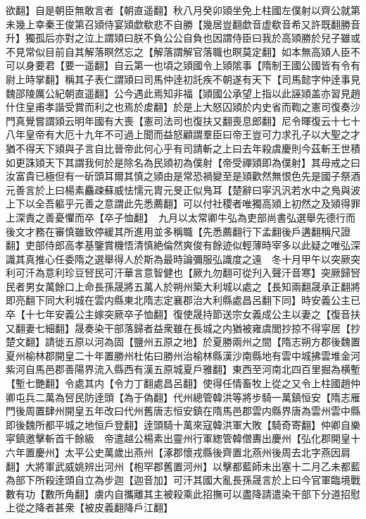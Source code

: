 欲翻】自是朝臣無敢言者【朝直遥翻】秋八月癸卯熲坐免上柱國左僕射以齊公就第未幾上幸秦王俊第召熲侍宴熲歔欷悲不自勝【幾居豈翻歔音虚欷音希又許既翻勝音升】獨孤后亦對之泣上謂熲曰朕不負公公自負也因謂侍臣曰我於高熲勝於兒子雖或不見常似目前自其解落瞑然忘之【解落謂解官落職也瞑莫定翻】如本無高熲人臣不可以身要君【要一遥翻】自云第一也頃之熲國令上熲隂事【隋制王國公國皆有令有尉上時掌翻】稱其子表仁謂熲曰司馬仲逹初託疾不朝遂有天下【司馬懿字仲逹事見魏邵陵厲公紀朝直遥翻】公今遇此焉知非福【熲國公承望上指以此誣熲盖亦習見趙什住皇甫孝諧受賞而利之也焉於䖍翻】於是上大怒囚熲於内史省而鞫之憲司復奏沙門真覺嘗謂熲云明年國有大喪【憲司法司也復扶又翻喪息郎翻】尼令暉復云十七十八年皇帝有大厄十九年不可過上聞而益怒顧謂羣臣曰帝王豈可力求孔子以大聖之才猶不得天下熲與子言自比晉帝此何心乎有司請斬之上曰去年殺虞慶則今茲斬王世積如更誅熲天下其謂我何於是除名為民熲初為僕射【帝受禪熲即為僕射】其母戒之曰汝富貴已極但有一斫頭耳爾其慎之熲由是常恐禍變至是熲歡然無恨色先是國子祭酒元善言於上曰楊素麤疎蘇威怯懦元胄元旻正似鳬耳【楚辭曰寜汎汎若水中之鳬與波上下以全吾軀乎元善之意謂此先悉薦翻】可以付社稷者唯獨高熲上初然之及熲得罪上深責之善憂懼而卒【卒子恤翻】　九月以太常卿牛弘為吏部尚書弘選舉先德行而後文才務在審慎雖致停緩其所進用並多稱職【先悉薦翻行下孟翻後戶遘翻稱尺證翻】吏部侍郎高孝基鑒賞機悟清慎絶倫然爽俊有餘迹似輕薄時宰多以此疑之唯弘深識其真推心任委隋之選舉得人於斯為最時論彌服弘識度之遠　冬十月甲午以突厥突利可汗為意利珍豆唘民可汗華言意智健也【厥九勿翻可從刋入聲汗音寒】突厥歸唘民者男女萬餘口上命長孫晟將五萬人於朔州築大利城以處之【長知兩翻晟承正翻將即亮翻下同大利城在雲内縣東北隋志定襄郡治大利縣處昌呂翻下同】時安義公主已卒【十七年安義公主嫁突厥卒子恤翻】復使晟持節送宗女義成公主以妻之【復音扶又翻妻七細翻】晟奏染干部落歸者益衆雖在長城之内猶被雍虞閭抄掠不得寜居【抄楚文翻】請徙五原以河為固【鹽州五原之地】於夏勝兩州之間【隋志朔方郡後魏置夏州榆林郡開皇二十年置勝州杜佑曰勝州治榆林縣漢沙南縣地有雲中城拂雲堆金河紫河自馬邑郡善陽界流入縣西有漢五原城夏戶雅翻】東西至河南北四百里掘為横塹【塹七艷翻】令處其内【令力丁翻處昌呂翻】使得任情畜牧上從之又令上柱國趙仲卿屯兵二萬為唘民防逹頭【為于偽翻】代州總管韓洪等將步騎一萬鎮恒安【隋志雁門後周置肆州開皇五年改曰代州舊唐志恒安鎮在隋馬邑郡雲内縣界唐為雲州雲中縣即後魏所都平城之地恒戶登翻】逹頭騎十萬來寇韓洪軍大敗【騎奇寄翻】仲卿自樂寜鎮邀擊斬首千餘級　帝遣越公楊素出靈州行軍緫管韓僧夀出慶州【弘化郡開皇十六年置慶州】太平公史萬歲出燕州【涿郡懷戎縣後齊置北燕州後周去北字燕因肩翻】大將軍武威姚辨出河州【枹罕郡舊置河州】以擊都藍師未出塞十二月乙未都藍為部下所殺逹頭自立為步迦【迦音加】可汗其國大亂長孫晟言於上曰今官軍臨境戰數有功【數所角翻】虜内自攜離其主被殺乘此招撫可以盡降請遣染干部下分道招慰上從之降者甚衆【被皮義翻降戶江翻】

